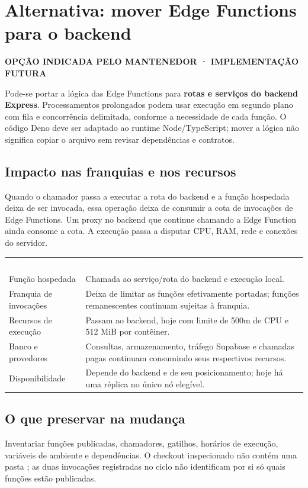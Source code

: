 \documentclass[10pt,a4paper]{article}
\newcommand{\code}[1]{{\ttfamily\footnotesize\detokenize{#1}}}
\newcommand{\headcell}[1]{\textcolor{white}{\bfseries #1}}
\newcommand{\pagechapter}[1]{\clearpage\section{#1}}
\newcommand{\tagline}[1]{{\footnotesize\bfseries\color{NFPrimary}#1\par}\vspace{3mm}}
\begin{document}
\pagechapter{Alternativa: mover Edge Functions para o backend}
\tagline{OPÇÃO INDICADA PELO MANTENEDOR · IMPLEMENTAÇÃO FUTURA}
Pode-se portar a lógica das Edge Functions para \textbf{rotas e serviços do backend Express}. Processamentos prolongados podem usar execução em segundo plano com fila e concorrência delimitada, conforme a necessidade de cada função. O código Deno deve ser adaptado ao runtime Node/TypeScript; mover a lógica não significa copiar o arquivo sem revisar dependências e contratos.

\subsection{Impacto nas franquias e nos recursos}
Quando o chamador passa a executar a rota do backend e a função hospedada deixa de ser invocada, essa operação deixa de consumir a cota de invocações de Edge Functions. Um proxy no backend que continue chamando a Edge Function ainda consome a cota. A execução passa a disputar CPU, RAM, rede e conexões do servidor.

\begingroup\small\renewcommand{\arraystretch}{1.3}
\par\noindent\begin{tabularx}{\linewidth}{@{}L{38mm}Y@{}}
\headcell{Antes}&\headcell{Depois da migração}\\
Função hospedada&Chamada ao serviço/rota do backend e execução local.\\
Franquia de invocações&Deixa de limitar as funções efetivamente portadas; funções remanescentes continuam sujeitas à franquia.\\
Recursos de execução&Passam ao backend, hoje com limite de 500m de CPU e 512 MiB por contêiner.\\
Banco e provedores&Consultas, armazenamento, tráfego Supabase e chamadas pagas continuam consumindo seus respectivos recursos.\\
Disponibilidade&Depende do backend e de seu posicionamento; hoje há uma réplica no único nó elegível.\\
\end{tabularx}\endgroup

\subsection{O que preservar na mudança}
Inventariar funções publicadas, chamadores, gatilhos, horários de execução, variáveis de ambiente e dependências. O checkout inspecionado não contém uma pasta \code{supabase/functions}; as duas invocações registradas no ciclo não identificam por si só quais funções estão publicadas.
\end{document}
